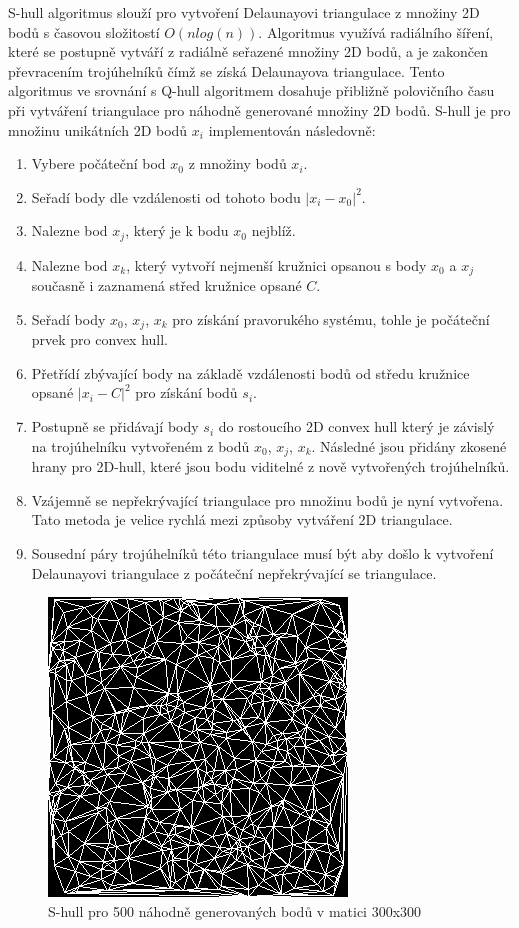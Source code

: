 \documentclass[czech,bachelor,dept460,male,csharp,cpdeclaration]{diploma}
\begin{document}
	
	S-hull algoritmus slouží pro vytvoření Delaunayovi triangulace z množiny 2D bodů s časovou složitostí $O(n  log(n))$. Algoritmus využívá radiálního šíření, které se postupně vytváří z radiálně seřazené množiny 2D bodů, a je zakončen převracením trojúhelníků čímž se získá Delaunayova triangulace. Tento algoritmus ve srovnání s Q-hull algoritmem dosahuje přibližně polovičního času při vytváření triangulace pro náhodně generované množiny 2D bodů. S-hull je pro množinu unikátních 2D bodů $x_i$ implementován následovně:
	\begin{enumerate}
		\item Vybere počáteční bod $x_0$ z množiny bodů $x_i$.
		\item Seřadí body dle vzdálenosti od tohoto bodu $|x_i - x_0|^2$.
		\item Nalezne bod $x_j$, který je k bodu $x_0$ nejblíž.
		\item Nalezne bod $x_k$, který vytvoří nejmenší kružnici opsanou s body $x_0$ a $x_j$ současně i zaznamená střed kružnice opsané $C$.
		\item Seřadí body $x_0$, $x_j$, $x_k$ pro získání pravorukého systému, tohle je počáteční prvek pro convex hull.
		\item Přetřídí zbývající body na základě vzdálenosti bodů od středu kružnice opsané $|x_i - C|^2$ pro získání bodů $s_i$.
		\item Postupně se přidávají body $s_i$ do rostoucího 2D convex hull který je závislý na trojúhelníku vytvořeném z bodů $x_0$, $x_j$, $x_k$. Následné jsou přidány zkosené hrany pro 2D-hull, které jsou bodu viditelné z nově vytvořených trojúhelníků.
		\item Vzájemně se nepřekrývající triangulace pro množinu bodů je nyní vytvořena. Tato metoda je velice rychlá mezi způsoby vytváření 2D triangulace.
		\item Sousední páry trojúhelníků této triangulace musí být  aby došlo k vytvoření Delaunayovi triangulace z počáteční nepřekrývající se triangulace.
	\end{enumerate}
	
	\begin{figure}
		\centering
		\includegraphics{Data/bmp_triangulace.png}
		\caption{S-hull pro 500 náhodně generovaných bodů v matici 300x300}
	\end{figure}
	
\end{document}
